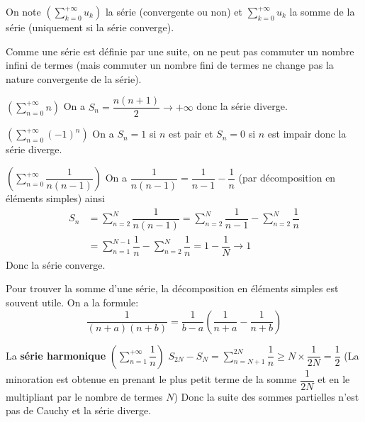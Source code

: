 \documentclass[a4paper, 12pt]{article}
\begin{document}
\begin{remarque}
    On note $(\sum\limits_{k=0}^{+\infty} u_k)$ la série (convergente ou non) et $\sum\limits_{k=0}^{+\infty} u_k$ la somme de la série (uniquement si la série converge).
\end{remarque}

\begin{remarque}
    Comme une série est définie par une suite, on ne peut pas commuter un nombre infini de termes
    (mais commuter un nombre fini de termes ne change pas la nature convergente de la série).
\end{remarque}

\begin{exemple}
    $(\sum\limits_{n=0}^{+\infty}n)$\n
    On a $S_n = \dfrac{n(n+1)}{2} \rightarrow +\infty$ donc la série diverge.
\end{exemple}

\begin{exemple}
    $(\sum\limits_{n=0}^{+\infty}(-1)^n)$\n
    On a $S_n = 1$ si $n$ est pair et $S_n = 0$ si $n$ est impair donc la série diverge.
\end{exemple}

\begin{exemple}
    $(\sum\limits_{n=0}^{+\infty}\dfrac{1}{n(n-1)})$\n
    On a $\dfrac{1}{n(n-1)} = \dfrac{1}{n-1} - \dfrac{1}{n}$ (par décomposition en éléments simples)\n
    ainsi
    \begin{align*}
        S_n &= \sum\limits_{n=2}^{N}\dfrac{1}{n(n-1)} = \sum\limits_{n=2}^{N}\dfrac{1}{n-1} - \sum\limits_{n=2}^{N}\dfrac{1}{n}\\
        &= \sum\limits_{n=1}^{N-1}\dfrac{1}{n} - \sum\limits_{n=2}^{N}\dfrac{1}{n} = 1 - \dfrac{1}{N} \rightarrow 1
    \end{align*}
    Donc la série converge.
\end{exemple}

\begin{methode}
    Pour trouver la somme d'une série, la décomposition en éléments simples est souvent utile.
    On a la formule:
    $$
    \dfrac{1}{(n + a)(n + b)} = \dfrac{1}{b - a}\left(\dfrac{1}{n + a} - \dfrac{1}{n + b}\right)
    $$
\end{methode}

\begin{exemple}
    La \textbf{série harmonique} $(\sum\limits_{n=1}^{+\infty}\dfrac{1}{n})$\n
    $S_{2N} - S_N = \sum\limits_{n=N+1}^{2N}\dfrac{1}{n} \geq N \times \dfrac{1}{2N} = \dfrac{1}{2}$\n
    (La minoration est obtenue en prenant le plus petit terme de la somme $\dfrac{1}{2N}$ et en le multipliant par le nombre de termes $N$)\n
    Donc la suite des sommes partielles n'est pas de Cauchy et la série diverge.
\end{exemple}
\end{document}

